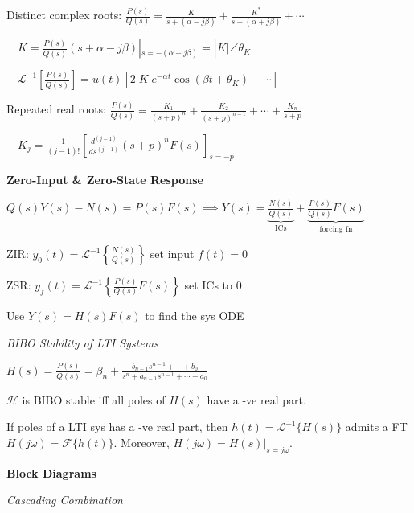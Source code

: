 \documentclass[twocolumn]{article}
\begin{document}
Distinct complex roots: $\frac{P(s)}{Q(s)} = \frac{K}{s + (\alpha - j\beta)} + \frac{K^*}{s + (\alpha + j\beta)} + \cdots$

$\quad K = \frac{P(s)}{Q(s)} (s + \alpha - j\beta) |_{s=-(\alpha - j\beta)} = |K| \angle \theta_K$

$\quad \mathcal{L}^{-1} \left[ \frac{P(s)}{Q(s)} \right] = u(t) \left[ 2|K| e^{-\alpha t} \cos(\beta t + \theta_K) + \cdots \right]$

Repeated real roots: $\frac{P(s)}{Q(s)} = \frac{K_1}{(s+p)^n} + \frac{K_2}{(s+p)^{n-1}} + \cdots + \frac{K_n}{s+p}$

$\quad K_j = \frac{1}{(j-1)!} \left[ \frac{d^{(j-1)}}{ds^{(j-1)}} (s+p)^n F(s) \right]_{s=-p}$

\dotfill


\textbf{Zero-Input \& Zero-State Response}

$Q(s)Y(s) - N(s) = P(s) F(s) \implies Y(s) = \underbrace{\frac{N(s)}{Q(s)}}_{\text{ICs}} + \underbrace{\frac{P(s)}{Q(s)} F(s)}_{\text{forcing fn}}$

ZIR: $y_0(t) = \mathcal{L}^{-1} \left\{ \frac{N(s)}{Q(s)} \right\}$ \hfill set input $f(t) = 0$

ZSR: $y_f(t) = \mathcal{L}^{-1} \left\{ \frac{P(s)}{Q(s)} F(s) \right\}$ \hfill set ICs to 0

Use $Y(s) = H(s) F(s)$ to find the sys ODE

\vspace{-.5em}
\dotfill

\textit{BIBO Stability of LTI Systems}

$H(s) = \frac{P(s)}{Q(s)} = \beta_n + \frac{b_{n-1}s^{n-1} + \cdots + b_0}{s^n + a_{n-1} s^{n-1} + \cdots + a_0}$

$\mathcal{H}$ is BIBO stable iff all poles of $H(s)$ have a -ve real part.

If poles of a LTI sys has a -ve real part, then $h(t) = \mathcal{L}^{-1} \{ H(s) \}$ admits a FT $H(j\omega) = \mathcal{F}\{h(t)\}$. Moreover, $H(j\omega) = H(s) |_{s=j\omega}$.

\dotfill

\textbf{Block Diagrams}

\textit{Cascading Combination}

\end{document}
